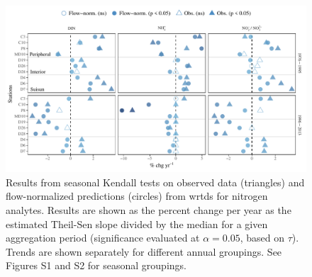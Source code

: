 \documentclass[journal = esthag, manuscript = article]{achemso}\usepackage[]{graphicx}\usepackage[]{color}
\begin{document}
\begin{figure}
\centering
\includegraphics[width=1\textwidth,page=1]{figs/trndcomp1.pdf}
\caption{Results from seasonal Kendall tests on observed data (triangles) and flow-normalized predictions (circles) from \ac{wrtds} for nitrogen analytes. Results are shown as the percent change per year as the estimated Theil-Sen slope divided by the median for a given aggregation period (significance evaluated at $\alpha = 0.05$, based on $\tau$). Trends are shown separately for different annual groupings. See Figures S1 and S2 for seasonal groupings.}
\label{fig:trndcomp1}   
\end{figure}
\end{document}
